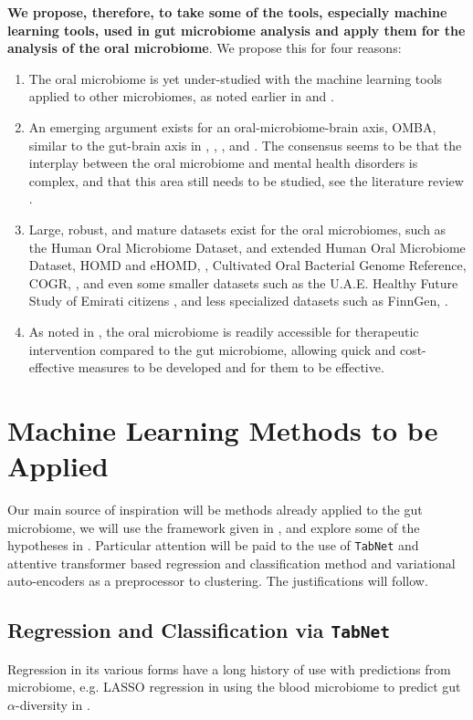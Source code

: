 \documentclass{article}
\begin{document}
\begin{multicols}{2}
\textbf{We propose, therefore, to take some of the tools, especially machine learning tools, used in gut microbiome analysis and apply them for the analysis of the oral microbiome}. We propose this for four reasons:
\begin{enumerate}[label = \roman*.]
	\item The oral microbiome is yet under-studied with the machine learning tools applied to other microbiomes, as noted earlier in \cite{goswami_role_2021} and \cite{tao_relationship_2024}.
	\item An emerging argument exists for an oral-microbiome-brain axis, OMBA, similar to the gut-brain axis in \cite{bowland_oral-microbiome-brain_2022}, \cite{xi_coming_2024}, \cite{martinez_role_2021}, and \cite{y_did_2020}. The consensus seems to be that the interplay between the oral microbiome and mental health disorders is complex, and that this area still needs to be studied, see the literature review \cite{skallevold_importance_2023}.
	\item Large, robust, and mature datasets exist for the oral microbiomes, such as the Human Oral Microbiome Dataset, and extended Human Oral Microbiome Dataset, HOMD and eHOMD, \cite{homd}, Cultivated Oral Bacterial Genome Reference, COGR, \cite{li_catalog_2023}, and even some smaller datasets such as the U.A.E. Healthy Future Study of Emirati citizens \cite{noauthor_human_nodate}, and less specialized datasets such as FinnGen, \cite{noauthor_finngen_nodate}.
	\item As noted in \cite{tao_relationship_2024}, the oral microbiome is readily accessible for therapeutic intervention compared to the gut microbiome, allowing quick and cost-effective measures to be developed and for them to be effective. 
\end{enumerate}
\section{Machine Learning Methods to be Applied} 
Our main source of inspiration will be methods already applied to the gut microbiome, we will use the framework given in \cite{li_machine_2022}, and explore some of the hypotheses in \cite{tao_relationship_2024}. Particular attention will be paid to the use of \texttt{TabNet} and attentive transformer based regression and classification method and variational auto-encoders as a preprocessor to clustering. The justifications will follow.
\subsection{Regression and Classification via \texttt{TabNet}}
Regression in its various forms have a long history of use with predictions from microbiome, e.g. LASSO regression in using the blood microbiome to predict gut $\alpha$-diversity in \cite{wilmanski_blood_2019}. 


\end{multicols}
\end{document}
